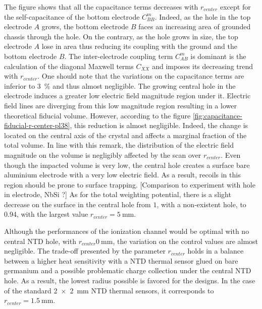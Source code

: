 The figure shows that all the capacitance terms decreases with $r_{center}$ except for the self-capacitance of the bottom electrode $C_{BB}^m$. Indeed, as the hole in the top electrode $A$ grows, the bottom electrode $B$ faces an increasing area of grounded chassis through the hole. On the contrary, as the hole grows in size, the top electrode $A$ lose in area thus reducing its coupling with the ground and the bottom electrode $B$. The inter-electrode coupling term $C_{AB}^m$ is dominant is the calculation of the diagonal Maxwell terms $C_{XX}$ and imposes its decreasing trend with $r_{center}$. One should note that the variations on the capacitance terms are inferior to \SI{3}{\percent} and thus almost negligible.
The growing central hole in the electrode induces a greater low electric field magnitude region under it. Electric field lines are diverging from this low magnitude region resulting in a lower theoretical fiducial volume. However, according to the figure \ref{fig:capacitance-fiducial-r-center-pl38}, this reduction is almost negligible. Indeed, the change is located on the central axis of the crystal and affects a marginal fraction of the total volume. In line with this remark, the distribution of the electric field magnitude on the volume is negligibly affected by the scan over $r_{center}$. Even though the impacted volume is very low, the central hole creates a surface bare aluminium electrode with a very low electric field. As a result, recoils in this region should be prone to surface trapping. {\color{red} [Comparison to experiment with hole in electrode, NbSi ?]}
As for the total weighting potential, there is a slight decrease on the surface in the central hole from $1$, with a non-existent hole, to \num{0.94}, with the largest value $r_{center}=\SI{5}{\mm}$.

Although the performances of the ionization channel would be optimal with no central NTD hole, with $r_{center}\SI{0}{\mm}$, the variation on the control values are almost negligible. The trade-off presented by the parameter $r_{center}$ holds in a balance between a higher heat sensitivity with a NTD thermal sensor glued on bare germanium and a possible problematic charge collection under the central NTD hole. As a result, the lowest radius possible is favored for the designs. In the case of the standard \SI{2 x 2}{\mm} NTD thermal sensors, it corresponds to $r_{center}=\SI{1.5}{\mm}$.



